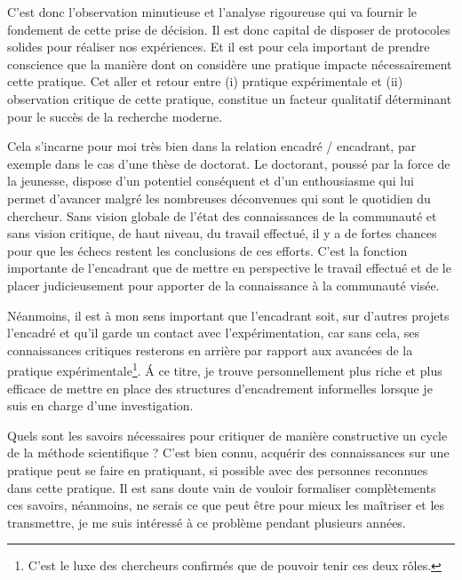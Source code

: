 C'est donc l'observation minutieuse et l'analyse rigoureuse qui va fournir le fondement de cette prise de décision. Il est donc capital de disposer de protocoles solides pour réaliser nos expériences. Et il est pour cela important de prendre conscience que la manière dont on considère une pratique impacte nécessairement cette pratique. Cet aller et retour entre (i) pratique expérimentale et (ii) observation critique de cette pratique, constitue un facteur qualitatif déterminant pour le succès de la recherche moderne.

Cela s'incarne pour moi très bien dans la relation encadré / encadrant, par exemple dans le cas d'une thèse de doctorat. Le doctorant, poussé par la force de la jeunesse, dispose d'un potentiel conséquent et d'un enthousiasme qui lui permet d'avancer malgré les nombreuses déconvenues qui sont le quotidien du chercheur. Sans vision globale de l'état des connaissances de la communauté et sans vision critique, de haut niveau, du travail effectué, il y a de fortes chances pour que les échecs restent les conclusions de ces efforts. C'est la fonction importante de l'encadrant que de mettre en perspective le travail effectué et de le placer judicieusement pour apporter de la connaissance à la communauté visée.

Néanmoins, il est à mon sens important que l'encadrant soit, sur d'autres projets l'encadré et qu'il garde un contact avec l'expérimentation, car sans cela, ses connaissances critiques resterons en arrière par rapport aux avancées de la pratique expérimentale\footnote{C'est le luxe des chercheurs confirmés que de pouvoir tenir ces deux rôles.}. \'A ce titre, je trouve personnellement plus riche et plus efficace de mettre en place des structures d'encadrement informelles lorsque je suis en charge d'une investigation.

Quels sont les savoirs nécessaires pour critiquer de manière constructive un cycle de la méthode scientifique ? C'est bien connu, acquérir des connaissances sur une pratique peut se faire en pratiquant, si possible avec des personnes reconnues dans cette pratique. Il est sans doute vain de vouloir formaliser complètements ces savoirs, néanmoins, ne serais ce que peut être pour mieux les maîtriser et les transmettre, je me suis intéressé à ce problème pendant plusieurs années.

